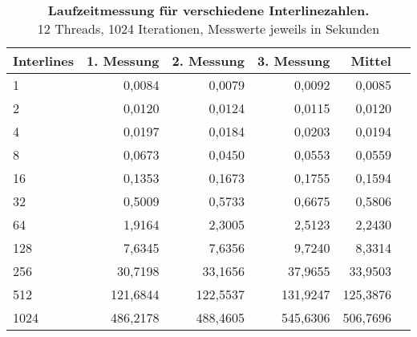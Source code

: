 \documentclass[a4paper,12pt]{scrartcl}
\begin{document}
\begin{table}[!h]
\begin{tabular}{|l|r|r|r|r|r|}
\hline
Interlines&1. Messung&2. Messung&3. Messung&Mittel\\
\hline
1&	0,0084	&0,0079	&0,0092	&0,0085\\
2&	0,0120	&0,0124	&0,0115	&0,0120\\
4&	0,0197	&0,0184	&0,0203	&0,0194\\
8&	0,0673	&0,0450	&0,0553	&0,0559\\
16&	0,1353	&0,1673	&0,1755	&0,1594\\
32&	0,5009	&0,5733	&0,6675	&0,5806\\
64&	1,9164	&2,3005	&2,5123	&2,2430\\
128&	7,6345	&7,6356	&9,7240	&8,3314\\
256&	30,7198	&33,1656	&37,9655	&33,9503\\
512&	121,6844	&122,5537	&131,9247	&125,3876\\
1024&	486,2178	&488,4605	&545,6306	&506,7696\\

\hline
\end{tabular}
\caption{\textbf{Laufzeitmessung für verschiedene Interlinezahlen.} \\12 Threads, 1024 Iterationen, Messwerte jeweils in Sekunden}
\end{table}
\end{document}
